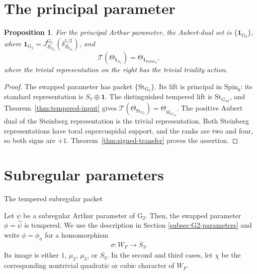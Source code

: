 \documentclass[12pt]{amsart}
\makeatletter
\renewcommand{\subsection}{\@startsection{subsection}{2}%
  \z@{.7\linespacing\@plus.5\linespacing}{.35\linespacing}%
  {\normalfont\bfseries\raggedright}}
\theoremstyle{definition}
\theoremstyle{plain}
\newtheorem{proposition}[definition]{Proposition}
\theoremstyle{remark}
\def\Spin{\mathrm{Spin}}
\def\PGSO{\mathrm{PGSO}}
\numberwithin{equation}{section}
\newcommand{\rG}{\mathrm{G}}
\newcommand{\St}{\mathrm{St}}
\makeatother
\begin{document}
\section{The principal parameter}\label{sec:principal-parameter}

\begin{proposition}\label{prop:principal-ecr}
For the principal Arthur parameter, the Aubert-dual set is
$\{\mathbf1_{\rG_2}\}$, where $\mathbf1_{\rG_2}=J_{B_{\rG_2}}^{\rG_2}(\delta_{B_{\rG_2}}^{1/2})$, and
\[
 \mathcal T(\Theta_{\mathbf1_{\rG_2}})=\Theta_{\mathbf1_{\PGSO_8}},
\]
where the trivial representation on the right has the trivial triality
action.
\end{proposition}
\begin{proof}
The swapped parameter has packet $\{\St_{\rG_2}\}$. Its lift is principal in
$\Spin_8$: its standard representation is $S_7\oplus\mathbf1$.
The distinguished tempered lift is $\St_{G_{\mathrm{ad}}}$, and
Theorem~\ref{thm:tempered-input} gives
$\mathcal T(\Theta_{\St_{\rG_2}})=\Theta_{\widetilde{\St_{G_{\mathrm{ad}}}}}$.
The positive Aubert dual of the Steinberg representation is the trivial
representation. Both Steinberg representations have toral supercuspidal
support, and the ranks are two and four, so both signs are $+1$.
Theorem~\ref{thm:signed-transfer} proves the assertion.
\end{proof}

\section{Subregular parameters}\label{sec:subregular}


\subsection{The tempered subregular packet}\label{sec:tempered-subregular}

Let $\psi$ be a subregular Arthur parameter of ${\rG_2}$.
Then, the swapped parameter $\phi = \widehat\psi$ is tempered.
We use the description in Section \ref{subsec:G2-parameters} and write $\phi = \phi_\sigma$ for a homomorphism
\begin{align*}
      \sigma \colon W_F \to S_3.
\end{align*}
Its image is either $1$, $\mu_2$, $\mu_3$, or $S_3$.
In the second and third cases, let $\chi$ be the corresponding nontrivial quadratic or cubic character of $W_F$.
\end{document}
